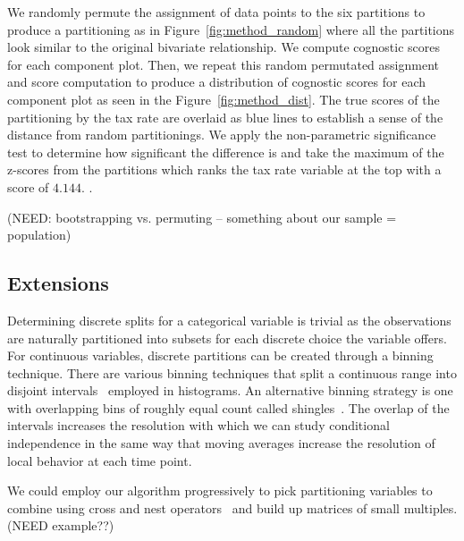 We randomly permute the assignment of data points to the six partitions to produce a partitioning as in Figure~\ref{fig:method_random} where all the partitions look similar to the original bivariate relationship. We compute cognostic scores for each component plot. Then, we repeat this random permutated assignment and score computation to produce a distribution of cognostic scores for each component plot as seen in the Figure~\ref{fig:method_dist}. The true scores of the partitioning by the tax rate are overlaid as blue lines to establish a sense of the distance from random partitionings. We apply the non-parametric significance test to determine how significant the difference is and take the maximum of the z-scores from the partitions which ranks the tax rate variable at the top with a score of $4.144$. .

(NEED: bootstrapping vs. permuting -- something about our sample = population)

\subsection{Extensions}
Determining discrete splits for a categorical variable is trivial as the observations are naturally partitioned into subsets for each discrete choice the variable offers. For continuous variables, discrete partitions can be created through a binning technique. There are various binning techniques that split a continuous range into disjoint intervals~\cite{Freedman1981,Scott2009} employed in histograms. An alternative binning strategy is one with overlapping bins of roughly equal count called shingles~\cite{Becker1996}. The overlap of the intervals increases the resolution with which we can study conditional independence in the same way that moving averages increase the resolution of local behavior at each time point. 

We could employ our algorithm progressively to pick partitioning variables to combine using cross and nest operators~\cite{Wilkinson2005GG,Stolte2002} and build up matrices of small multiples. (NEED example??)


